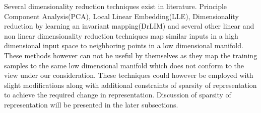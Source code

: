 \documentclass[12pt,twoside]{article}
\theoremstyle{plain}
\theoremstyle{definition}
\theoremstyle{remark}
\begin{document}
Several dimensionality reduction techniques exist in literature. Principle Component Analysis(PCA), Local Linear Embedding(LLE), Dimensionality reduction by learning an invariant mapping(DrLIM) and several other linear and non linear dimensionality reduction techniques map similar inputs in a high dimensional input space to neighboring points in a low dimensional manifold. These methods however can not be useful by themselves as they map the training samples to the same low dimensional manifold which does not conform to the view under our consideration. These techniques could however be employed with slight modifications along with additional constraints of sparsity of representation to achieve the required change in representation. Discussion of sparsity of representation will be presented in the later subsections. 
 
\end{document}
